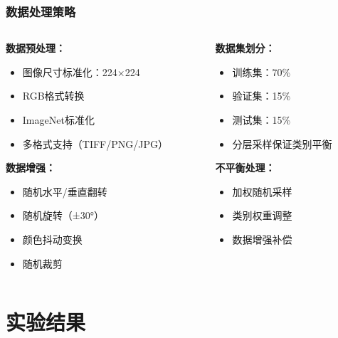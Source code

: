 \documentclass[10pt]{beamer}
\begin{document}
\begin{frame}
\frametitle{数据处理策略}
\begin{columns}
\begin{column}{0.5\textwidth}
\textbf{数据预处理：}
\begin{itemize}
    \item 图像尺寸标准化：224×224
    \item RGB格式转换
    \item ImageNet标准化
    \item 多格式支持（TIFF/PNG/JPG）
\end{itemize}

\vspace{0.3cm}
\textbf{数据增强：}
\begin{itemize}
    \item 随机水平/垂直翻转
    \item 随机旋转（±30°）
    \item 颜色抖动变换
    \item 随机裁剪
\end{itemize}
\end{column}

\begin{column}{0.5\textwidth}
\textbf{数据集划分：}
\begin{itemize}
    \item 训练集：70\%
    \item 验证集：15\%
    \item 测试集：15\%
    \item 分层采样保证类别平衡
\end{itemize}

\vspace{0.3cm}
\textbf{不平衡处理：}
\begin{itemize}
    \item 加权随机采样
    \item 类别权重调整
    \item 数据增强补偿
\end{itemize}
\end{column}
\end{columns}
\end{frame}

\section{实验结果}
\end{document}
